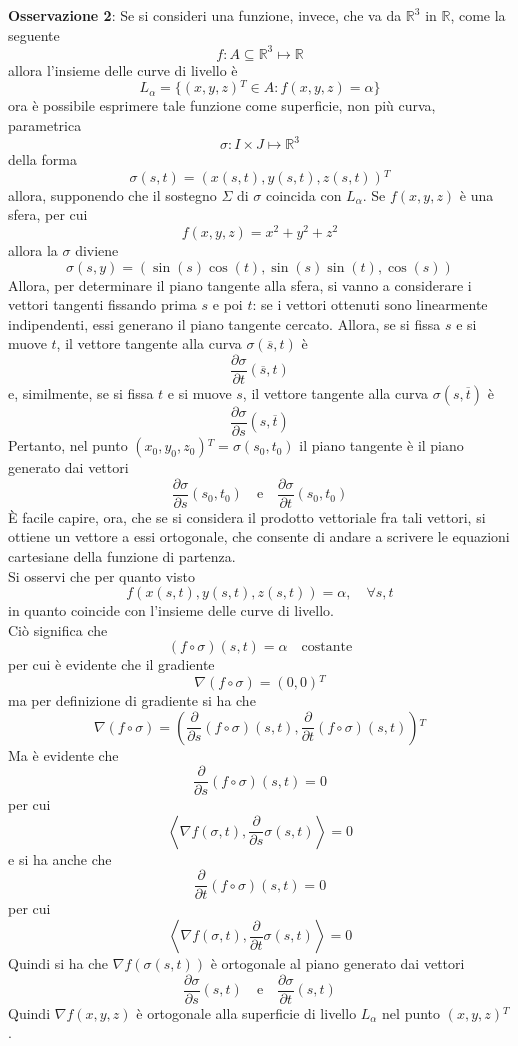 \documentclass[a4paper]{extarticle}
\begin{document}
\vspace{1em}
\noindent
\textbf{Osservazione 2}: Se si consideri una funzione, invece, che va da $\mathbb{R}^3$ in $\mathbb{R}$, come la seguente
\[f : A \subseteq \mathbb{R}^3 \longmapsto \mathbb{R}\]
allora l'insieme delle curve di livello è
\[L_\alpha = \{(x,y,z){^T} \in A : f(x,y,z)=\alpha\}\]
ora è possibile esprimere tale funzione come superficie, non più curva, parametrica
\[\sigma : I \times J \longmapsto \mathbb{R}^3\]
della forma
\[\sigma(s,t) = \left(x(s,t),y(s,t),z(s,t)\right){^T}\]
allora, supponendo che il sostegno $\Sigma$ di $\sigma$ coincida con $L_\alpha$. Se $f(x,y,z)$ è una sfera, per cui
\[f(x,y,z)=x^2+y^2+z^2\]
allora la $\sigma$ diviene
\[\sigma(s,y)= \left(\sin(s)\cos(t),\sin(s)\sin(t),\cos(s)\right)\]
Allora, per determinare il piano tangente alla sfera, si vanno a considerare i vettori tangenti fissando prima $s$ e poi $t$: se i vettori ottenuti sono linearmente indipendenti, essi generano il piano tangente cercato.
Allora, se si fissa $s$ e si muove $t$, il vettore tangente alla curva $\sigma(\overline{s},t)$ è
\[\frac{\partial \sigma}{\partial t} (\overline{s}, t)\]
e, similmente, se si fissa $t$ e si muove $s$, il vettore tangente alla curva $\sigma(s,\overline{t})$ è
\[\frac{\partial \sigma}{\partial s}(s,\overline{t})\]
Pertanto, nel punto $(x_0,y_0,z_0){^T} = \sigma(s_0,t_0)$ il piano tangente è il piano generato dai vettori
\[\frac{\partial \sigma}{\partial s}(s_0,t_0) \hspace{1em} \text{e} \hspace{1em} \frac{\partial \sigma}{\partial t} (s_0,t_0)\]
È facile capire, ora, che se si considera il prodotto vettoriale fra tali vettori, si ottiene un vettore a essi ortogonale, che consente di andare a scrivere le equazioni cartesiane della funzione di partenza.\\
Si osservi che per quanto visto
\[f\left(x(s,t),y(s,t),z(s,t)\right)=\alpha, \hspace{1em} \forall s, t\]
in quanto coincide con l'insieme delle curve di livello.\\
Ciò significa che
\[(f \circ \sigma)(s,t) = \alpha \hspace{1em} \text{costante}\]
per cui è evidente che il gradiente
\[\nabla(f \circ \sigma) = (0,0){^T}\]
ma per definizione di gradiente si ha che
\[\nabla(f \circ \sigma) = \left(\frac{\partial}{\partial s}(f \circ \sigma)(s,t), \frac{\partial }{\partial t}(f \circ \sigma)(s,t)\right){^T}\]
Ma è evidente che
\[\frac{\partial}{\partial s}(f \circ \sigma)(s,t) = 0\]
per cui
\[\left<\nabla f(\sigma,t), \frac{\partial}{\partial s} \sigma(s,t)\right> = 0\]
e si ha anche che
\[\frac{\partial}{\partial t}(f \circ \sigma)(s,t) = 0\]
per cui
\[\left<\nabla f(\sigma,t), \frac{\partial}{\partial t} \sigma(s,t)\right> = 0\]
Quindi si ha che $\nabla f(\sigma(s,t))$ è ortogonale al piano generato dai vettori
\[\frac{\partial \sigma}{\partial s}(s,t) \hspace{1em} \text{e} \hspace{1em} \frac{\partial \sigma}{\partial t} (s,t)\]
Quindi $\nabla f(x,y,z)$ è ortogonale alla superficie di livello $L_\alpha$ nel punto $(x,y,z){^T}$.
\end{document}
